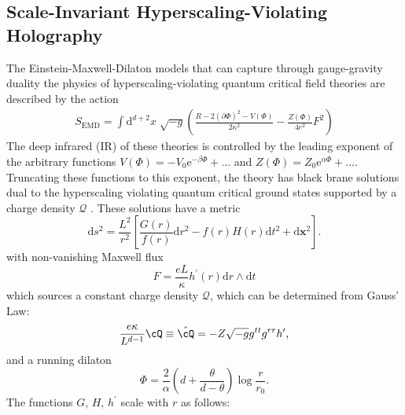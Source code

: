 \documentclass[10pt, oneside]{book}
\begin{document}
\begin{doublespace}
\section{Scale-Invariant Hyperscaling-Violating Holography}
The Einstein-Maxwell-Dilaton models that can capture through gauge-gravity duality the physics of hyperscaling-violating quantum critical field theories are described by the action
\begin{align}
  \label{eq:1}
S_{\mathrm{EMD}} = \int \mathrm{d}^{d+2}x\; \sqrt{-g} \left(\frac{R-2(\partial\Phi)^2 - V(\Phi)}{2\kappa^2} - \frac{Z(\Phi)}{4e^2}F^2\right)
\end{align}
The deep infrared (IR) of these theories is controlled by the leading exponent of the arbitrary functions $V(\Phi)=-V_0 \mathrm{e}^{-\beta\Phi}+\ldots$ and $Z(\Phi)=Z_0 \mathrm{e}^{\alpha\Phi}+\ldots$. Truncating these functions to this exponent, the theory has black brane solutions dual to the hyperscaling violating quantum critical ground states %
supported by a 
charge density $\mathcal{Q}$ \cite{Charmousis:2010zz,Iizuka:2011hg,Huijse:2011ef}. %
These solutions have a metric  %
\begin{equation}
\label{eq1}
\mathrm{d}s^2  = \frac{L^2}{r^2}\left[\frac{G(r)}{f(r)}\mathrm{d}r^2 - f(r)H(r) \mathrm{d}t^2 + \mathrm{d}\mathbf{x}^2\right].
\end{equation}with non-vanishing Maxwell flux  \begin{equation}
F = \frac{eL}{\kappa} h^\prime(r) \mathrm{d}r\wedge\mathrm{d}t
\end{equation}which sources a constant charge density $\mathcal{Q}$, which can be determined from Gauss' Law:\begin{equation}
\frac{e\kappa}{L^{d-1}} \cQ \equiv \hat{\cQ}=- Z\sqrt{-g}g^{tt}g^{rr} h^\prime, 
\end{equation} and a running dilaton \begin{equation}
\Phi = \frac{2}{\alpha} \left(d+\frac{\theta}{d-\theta}\right) \log \frac{r}{r_0}.
\end{equation}The functions $G$, $H$, $h^\prime$ scale with $r$ as follows:

\end{doublespace}
\end{document}
